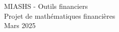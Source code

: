 \documentclass[a4paper,11pt]{article}
\begin{document}
\begin{center}
\Huge{MIASHS - Outils financiers}\\[0.5cm]
\LARGE{Projet de mathématiques financières}\\[0.2cm]
\Large{Mars 2025}
\end{center}
\end{document}
